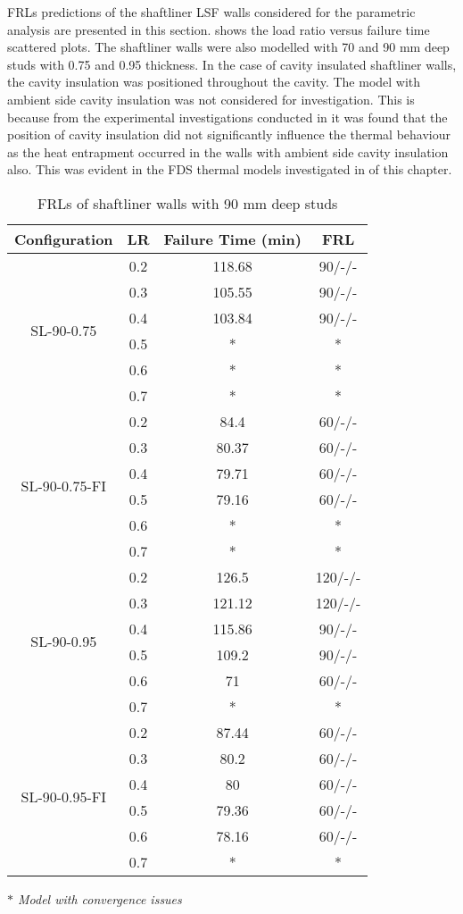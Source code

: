 FRLs predictions of the shaftliner LSF walls considered for the parametric analysis are presented in this section.  shows the load ratio versus failure time scattered plots. The shaftliner walls were also modelled with 70 and 90 mm deep studs with 0.75 and 0.95 thickness. In the case of cavity insulated shaftliner walls, the cavity insulation was positioned throughout the cavity. The model with ambient side cavity insulation was not considered for investigation. This is because from the experimental investigations conducted in  it was found that the position of cavity insulation did not significantly influence the thermal behaviour as the heat entrapment occurred in the walls with ambient side cavity insulation also. This was evident in the FDS thermal models investigated in  of this chapter.
\begin{table}[!htbp]
	\centering
	\caption{FRLs of shaftliner walls with 90 mm deep studs}
	  \begin{tabular}{cccc}
	  \toprule
	  Configuration & LR    & Failure Time (min) & FRL \\
	  \midrule
	  \multirow{6}[2]{*}{SL-90-0.75} & 0.2   & 118.68 & 90/-/- \\
			& 0.3   & 105.55 & 90/-/- \\
			& 0.4   & 103.84 & 90/-/- \\
			& 0.5   & *     & * \\
			& 0.6   & *     & * \\
			& 0.7   & *     & * \\
	  \midrule
	  \multirow{6}[2]{*}{SL-90-0.75-FI} & 0.2   & 84.4  & 60/-/- \\
			& 0.3   & 80.37 & 60/-/- \\
			& 0.4   & 79.71 & 60/-/- \\
			& 0.5   & 79.16 & 60/-/- \\
			& 0.6   & *     & * \\
			& 0.7   & *     & * \\
	  \midrule
	  \multirow{6}[2]{*}{SL-90-0.95} & 0.2   & 126.5 & 120/-/- \\
			& 0.3   & 121.12 & 120/-/- \\
			& 0.4   & 115.86 & 90/-/- \\
			& 0.5   & 109.2 & 90/-/- \\
			& 0.6   & 71    & 60/-/- \\
			& 0.7   & *     & * \\
	  \midrule
	  \multirow{6}[2]{*}{SL-90-0.95-FI} & 0.2   & 87.44 & 60/-/- \\
			& 0.3   & 80.2  & 60/-/- \\
			& 0.4   & 80    & 60/-/- \\
			& 0.5   & 79.36 & 60/-/- \\
			& 0.6   & 78.16 & 60/-/- \\
			& 0.7   & *     & * \\
	  \bottomrule
	  \end{tabular}%
	\label{tab:frl-parametric-sl-90}%

	\small \textit{$*$ Model with convergence issues}
  \end{table}%

